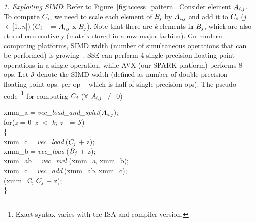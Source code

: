      \vspace*{0.1in}
     {\it{1. Exploiting SIMD}}: Refer to Figure~\ref{fig:access_pattern}. 
     Consider element $A_{{\it{i}},{\it{j}}}$. To compute
     $C_{\it{i}}$, we need to scale each element of
     $B_{{\it{j}}}$ by  $A_{{\it{i}},{\it{j}}}$ and add it to
     $C_{\it{i}}$ ({\it{j}}$\in$[1..{\it{n}}]) ($C_{\it{i}}$ +=
     $A_{{\it{i}},{\it{j}}}$ x $B_{{\it{j}}}$). Note that there are
     {\it{k}} elements in $B_{{\it{j}}}$, which are also stored
     consecutively (matrix stored in a row-major fashion).
     On modern computing platforms, SIMD width (number of simultaneous
     operations that can be performed) is
     growing~\cite{intel2}. SSE can perform 4
     single-precision floating point operations in a single operation, while
     AVX (our SPARK platform) performs 8 ops. Let $\mathcal{S}$ denote the SIMD width
     (defined as number of double-precision floating point ops. per op
     -- which is half of single-precision ops).
     The pseudo-code~\footnote{Exact syntax varies with the ISA and
     compiler version.} for computing $C_{\it{i}}$ ($\forall$ $A_{{\it{i}},{\it{j}}}$ $\neq$ 0)
     \vspace*{0.03in}

     \hspace*{-0.0in}xmm\_a = {\it{vec\_load\_and\_splat}}($A_{{\it{i}},{\it{j}}}$); \\
     for\hspace*{0.02in}({\it{z}} = 0; {\it{z}} $<$ {\it{k}}; {\it{z}} += $\mathcal{S}$)\\
     \{\\
         \hspace*{0.2in}xmm\_c = {\it{vec\_load}}  ($C_{{\it{j}}}$ + z); \\
         \hspace*{0.2in}xmm\_b = {\it{vec\_load}}  ($B_{{\it{j}}}$ + z); \\
         \hspace*{0.2in}xmm\_ab = {\it{vec\_mul}}  (xmm\_a, xmm\_b); \\
         \hspace*{0.2in}xmm\_c = {\it{vec\_add}}  (xmm\_ab, xmm\_c); \\
          (xmm\_C,  $C_{{\it{j}}}$ + z); \\
     \}\\

